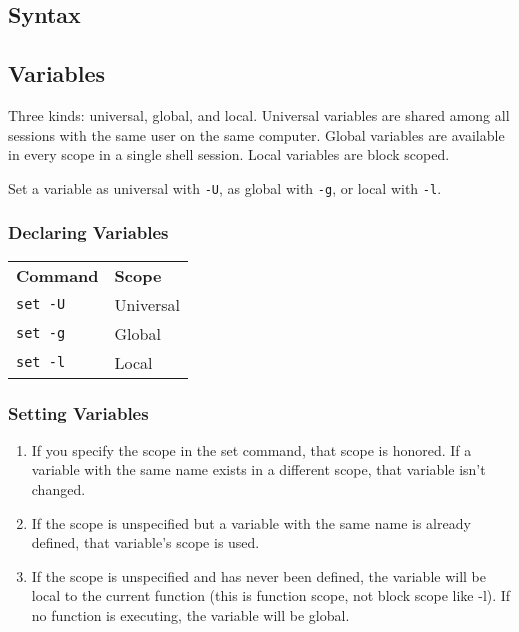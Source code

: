 \documentclass[10pt]{extarticle}
\begin{document}
\begin{paracol}{2}

\section*{Syntax}

\subsection*{Variables}

Three kinds: universal, global, and local.
Universal variables are shared among all sessions with the same user on the same computer.
Global variables are available in every scope in a single shell session.
Local variables are block scoped.

Set a variable as universal with \texttt{-U}, as global with \texttt{-g}, or local with \texttt{-l}.

\subsubsection*{Declaring Variables}

\begin{tabularx}{\columnwidth}{X X}
    \rowcolor{DarkBackground}
    \textbf{Command} & \textbf{Scope} \\
    \texttt{set -U} & Universal \\
    \texttt{set -g} & Global \\
    \texttt{set -l} & Local
\end{tabularx}

\subsubsection*{Setting Variables}

\begin{enumerate}

    \item If you specify the scope in the set command, that scope is honored.
        If a variable with the same name exists in a different scope, that variable isn't changed.
    \item If the scope is unspecified but a variable with the same name is already defined, that variable's scope is used.
    \item If the scope is unspecified and has never been defined, the variable will be local to the current function (this is function scope, not block scope like -l).
        If no function is executing, the variable will be global.
\end{enumerate}


\end{paracol}
\end{document}
